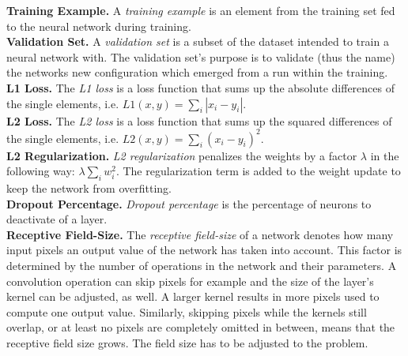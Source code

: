 \noindent\textbf{Training Example.} A \textit{training example} is an element from the training set fed to the neural network during training. \\

\noindent\textbf{Validation Set.} A \textit{validation set} is a subset of the dataset intended to train a neural network with. The validation set's purpose is to validate (thus the name) the networks new configuration which emerged from a run within the training. \\

\noindent\textbf{L1 Loss.} The \textit{L1 loss} is a loss function that sums up the absolute differences of the single elements, i.e. $L1(x, y) = \sum\limits_i |x_i - y_i|$. \\

\noindent\textbf{L2 Loss.} The \textit{L2 loss} is a loss function that sums up the squared differences of the single elements, i.e. $L2(x, y) = \sum\limits_i (x_i - y_i)^2$. \\

\noindent\textbf{L2 Regularization.} \textit{L2 regularization} penalizes the weights by a factor $\lambda$ in the following way: $\lambda \sum\limits_i w_i^2$. The regularization term is added to the weight update to keep the network from overfitting. \\

\noindent\textbf{Dropout Percentage.} \textit{Dropout percentage} is the percentage of neurons to deactivate of a layer. \\

\noindent\textbf{Receptive Field-Size.} The \textit{receptive field-size} of a network denotes how many input pixels an output value of the network has taken into account. This factor is determined by the number of operations in the network and their parameters. A convolution operation can skip pixels for example and the size of the layer's kernel can be adjusted, as well. A larger kernel results in more pixels used to compute one output value. Similarly, skipping pixels while the kernels still overlap, or at least no pixels are completely omitted in between, means that the receptive field size grows. The field size has to be adjusted to the problem.

